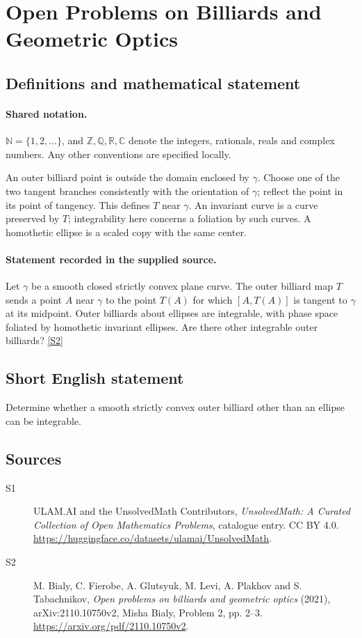 \documentclass[11pt]{article}
\newcommand{\sref}[2]{\hyperlink{source:#1:#2}{[S#2]}}
\begin{document}
\section{Open Problems on Billiards and Geometric Optics}\label{statement}

\subsection{Definitions and mathematical statement}

\paragraph{Shared notation.}$\mathbb N=\{1,2,\ldots\}$, and $\mathbb Z,\mathbb Q,\mathbb R,\mathbb C$ denote the integers, rationals, reals and complex numbers. Any other conventions are specified locally.


An outer billiard point is outside the domain enclosed by $\gamma$. Choose one of the two tangent branches consistently with the orientation of $\gamma$; reflect the point in its point of tangency. This defines $T$ near $\gamma$. An invariant curve is a curve preserved by $T$; integrability here concerns a foliation by such curves. A homothetic ellipse is a scaled copy with the same center.
\paragraph{Statement recorded in the supplied source.}
Let $\gamma$ be a smooth closed strictly convex plane curve. The outer billiard map $T$ sends a point $A$ near $\gamma$ to the point $T(A)$ for which $[A,T(A)]$ is tangent to $\gamma$ at its midpoint. Outer billiards about ellipses are integrable, with phase space foliated by homothetic invariant ellipses. Are there other integrable outer billiards? \sref{statement}{2}
\subsection{Short English statement}
Determine whether a smooth strictly convex outer billiard other than an ellipse can be integrable.
\subsection{Sources}
\begin{description}
\item[\hypertarget{source:statement:1}{S1}] ULAM.AI and the UnsolvedMath Contributors, \emph{UnsolvedMath: A Curated Collection of Open Mathematics Problems}, catalogue entry. CC BY 4.0. \url{https://huggingface.co/datasets/ulamai/UnsolvedMath}.
\item[\hypertarget{source:statement:2}{S2}] M. Bialy, C. Fierobe, A. Glutsyuk, M. Levi, A. Plakhov and S. Tabachnikov, \emph{Open problems on billiards and geometric optics} (2021), arXiv:2110.10750v2, Misha Bialy, Problem 2, pp. 2--3. \url{https://arxiv.org/pdf/2110.10750v2}.
\end{description}
\label{end:statement}
\end{document}
